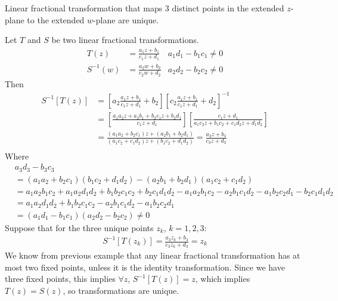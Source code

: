 \documentclass[12pt, english]{book}
\makeatletter
\renewenvironment{proof}[1][\proofname]{\par
	\pushQED{\qed}%
	\normalfont \topsep6\p@\@plus6\p@\relax
	\list{}{%
		\settowidth{\leftmargin}{\itshape\proofname:\hskip\labelsep}%
		\setlength{\labelwidth}{0pt}%
		\setlength{\itemindent}{-\leftmargin}%
		}%
	\item[\hskip\labelsep\itshape#1\@addpunct{:}]\ignorespaces
	}{\popQED\endlist\@endpefalse}
\makeatother
\begin{document}
	\begin{example}Linear fractional transformation that maps 3 distinct points in the extended \(z\)-plane to the extended \(w\)-plane are unique.
		\begin{proof}
			{\color{Grey}
			Let \(T\) and \(S\) be two linear fractional transformations.
			\begin{align*}
				T(z) &= \frac{a_1 z + b_1}{c_1 z + d_1}
					& a_1 d_1 - b_1 c_1 \neq 0 \\
				S^{-1}(w) &= \frac{a_2 w + b_2}{c_2 w + d_2}
					& a_2 d_2 - b_2 c_2 \neq 0
			\end{align*}
			Then
			\begin{align*}
				S^{-1}[T(z)] 
				&= \left[a_2 \frac{a_1 z + b_1}{c_1 z + d_1} + b_2\right]\left[c_2 \frac{a_1 z + b_1}{c_1 z + d_1} + d_2\right]^{-1} \\
				&= \left[\frac{a_1 a_2 z + a_2 b_1 + b_2 c_1 z + b_2 d_1}{c_1 z + d_1}\right]\left[\frac{c_1 z + d_1}{a_1 c_2 z + b_1 c_2 + c_1 d_2 z + d_1 d_2}\right] \\
				&= \frac{(a_1 a_2 + b_2 c_1)z + (a_2 b_1 + b_2 d_1)}{(a_1 c_2 + c_1 d_2)z + (b_1 c_2 + d_1 d_2)}
				 = \frac{a_3 z + b_3}{c_3 z + d_3} \\
			\end{align*}
			Where
			\begin{align*}
				& a_3 d_3 - b_3 c_3 \\
				&= (a_1 a_2 + b_2 c_1)(b_1 c_2 + d_1 d_2) - (a_2 b_1 + b_2 d_1)(a_1 c_2 + c_1 d_2) \\
				&= a_1 a_2 b_1 c_2 + a_1 a_2 d_1 d_2 + b_1 b_2 c_1 c_2 + b_2 c_1 d_1 d_2 - a_1 a_2 b_1 c_2 - a_2 b_1 c_1 d_2 - a_1 b_2 c_2 d_1 - b_2 c_1 d_1 d_2 \\
				&= a_1 a_2 d_1 d_2 + b_1 b_2 c_1 c_2 - a_2 b_1 c_1 d_2 - a_1 b_2 c_2 d_1 \\
				&= (a_1 d_1 - b_1 c_1)(a_2 d_2 - b_2 c_2) \neq 0
			\end{align*}
			Suppose that for the three unique points \(z_k\), \(k = 1, 2, 3\):
			\begin{align*}
				S^{-1}[T(z_k)] = \frac{a_3 z_k + b_3}{c_3 z_k + d_3} = z_k
			\end{align*}
			We know from previous example that any linear fractional transformation has at most two fixed points, unless it is the identity transformation. Since we have three fixed points, this implies \(\forall z\), \(S^{-1}[T(z)] = z\), which implies \(T(z) = S(z)\), so transformations are unique.
			}
		\end{proof}
	\end{example}
	
\end{document}
